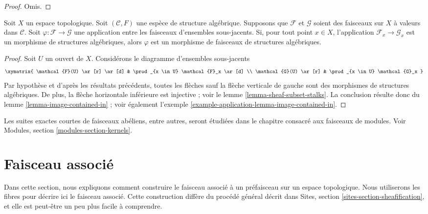 \begin{proof}
Omis.
\end{proof}


\begin{lemma}
\label{lemma-check-homomorphism-stalks}
Soit $X$ un espace topologique.
Soit $(\mathcal{C}, F)$ une espèce de structure algébrique.
Supposons que $\mathcal{F}$ et $\mathcal{G}$ soient des faisceaux sur $X$ à
valeurs dans $\mathcal{C}$.
Soit $\varphi : \mathcal{F} \to \mathcal{G}$ une application entre les
faisceaux d'ensembles sous-jacents.
Si, pour tout point $x \in X$, l'application
$\mathcal{F}_x \to \mathcal{G}_x$ est un morphisme de structures
algébriques, alors $\varphi$ est un morphisme de faisceaux de structures
algébriques.
\end{lemma}

\begin{proof}
Soit $U$ un ouvert de $X$. Considérons le diagramme d'ensembles sous-jacents
$$
\xymatrix{
\mathcal{F}(U) \ar[r] \ar[d] &
\prod_{x \in U} \mathcal{F}_x \ar[d] \\
\mathcal{G}(U) \ar[r] &
\prod_{x \in U} \mathcal{G}_x
}
$$
Par hypothèse et d'après les résultats précédents, toutes les flèches sauf la
flèche verticale de gauche sont des morphismes de structures algébriques. De
plus, la flèche horizontale inférieure est injective ; voir le
lemme \ref{lemma-sheaf-subset-stalks}.
La conclusion résulte donc du lemme \ref{lemma-image-contained-in} ; voir
également l'exemple \ref{example-application-lemma-image-contained-in}.
\end{proof}

\noindent
Les suites exactes courtes de faisceaux abéliens, entre autres, seront étudiées
dans le chapitre consacré aux faisceaux de modules. Voir
Modules, section \ref{modules-section-kernels}.



\section{Faisceau associé}
\label{section-sheafification}

\noindent
Dans cette section, nous expliquons comment construire le faisceau associé
à un préfaisceau sur un espace topologique. Nous utiliserons les fibres
pour décrire ici le faisceau associé. Cette construction diffère
du procédé général décrit dans Sites, section
\ref{sites-section-sheafification}, et elle est peut-être un peu
plus facile à comprendre.

